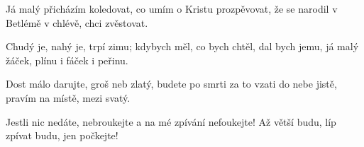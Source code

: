 \vskip-5mm
\IncludeLilypond

Já malý přicházím koledovat,
co umím o Kristu prozpěvovat,
že se narodil v Betlémě v chlévě,
chci zvěstovat.

Chudý je, nahý je, trpí zimu;
kdybych měl, co bych chtěl, dal bych jemu,
já malý žáček, plínu i fáček
i peřinu.

Dost málo darujte, groš neb zlatý,
budete po smrti za to vzati
do nebe jistě, pravím na místě,
mezi svatý.

Jestli nic nedáte, nebroukejte
a na mé zpívání nefoukejte!
Až větší budu, líp zpívat budu,
jen počkejte!
